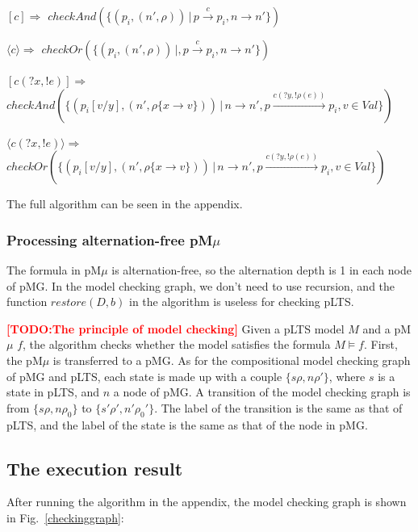 \documentclass[runningheads,a4paper]{llncs}
\newcommand{\TODO}[1]{\textcolor{red}{\textbf{[TODO:#1]}}}
\begin{document}
$[c]\Rightarrow$ $checkAnd(\{ (p_{i}, (n', \rho))\,|\, p \xrightarrow{c} p_{i}, n\rightarrow n' \})$
		
$\langle c\rangle\Rightarrow$ 
	 $checkOr(\{ (p_{i}, (n',\rho))\,|, p \xrightarrow{c} p_{i}, n \rightarrow n'\})$
		
$[c(?x, !e)]\Rightarrow$
	$ checkAnd(\{ (p_{i}[v/y], (n',\rho\{x \rightarrow v\}))\,|\,  n \rightarrow n', p \xrightarrow{c(?y, !\rho(e)) } p_{i},v\in Val\})$
		
{$\langle c(?x, !e)\rangle\Rightarrow$}
	 $ checkOr(\{ (p_{i}[v/y], (n', \rho\{x \rightarrow v\}))\,|\,  n \rightarrow n', p \xrightarrow{c(?y, !\rho(e))} p_{i},v\in Val\})$
		
The full algorithm can be seen in the appendix.

\subsubsection{Processing alternation-free pM$\mu$}
The formula in pM$\mu$ is alternation-free, so the alternation depth is 1 in each node of pMG. In the model checking graph, we don't need to use recursion, and the function $restore(D, b)$ in the algorithm is useless for checking pLTS.

\TODO{The principle of model checking}
Given a pLTS model $M$ and a pM$\mu$ $f$, the algorithm checks whether the model satisfies the formula $M\models f$. First, the pM$\mu$ is transferred to a pMG. As for the compositional model checking graph of pMG and pLTS, each state is made up with a couple $\{s\rho, n\rho'\}$, where $s$ is a state in pLTS, and $n$ a node of pMG. A transition of the model checking graph is from $\{s\rho, n\rho_{0}\}$ to $\{s'\rho', n'\rho_{0}'\}$.  The label of the transition is the same as that of pLTS, and the label of the state is the same as that of the node in pMG.



\subsection{The execution result}

After running the algorithm in the appendix, the model checking graph is shown in Fig.~\ref{checkinggraph}:
\end{document}

